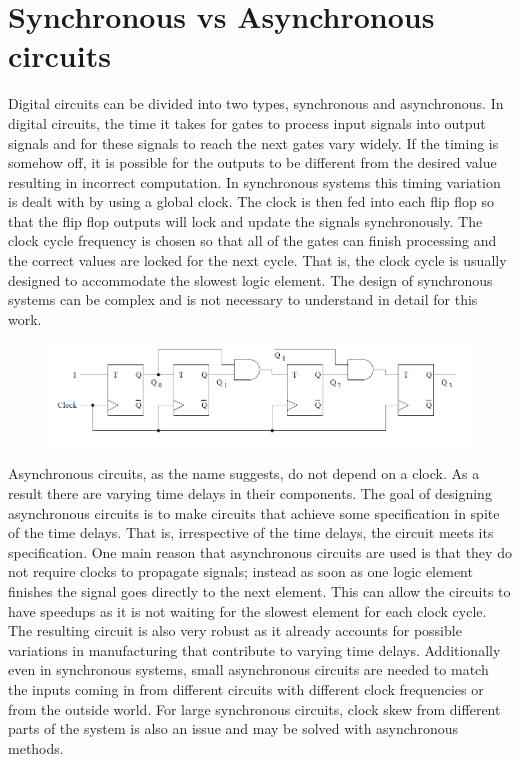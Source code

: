 \documentclass[12pt]{report}
\begin{document}
\section{Synchronous vs Asynchronous circuits}
Digital circuits can be divided into two types, synchronous and asynchronous.  In digital circuits, the time it takes for gates to process input signals into output signals and for these signals to reach the next gates vary widely.  If the timing is somehow off, it is possible for the outputs to be different from the desired value resulting in incorrect computation. In synchronous systems this timing variation is dealt with by using a global clock.  The clock is then fed into each flip flop so that the flip flop outputs will lock and update the signals synchronously. The clock cycle frequency is chosen so that all of the gates can finish processing and the correct values are locked for the next cycle. That is, the clock cycle is usually designed to accommodate the slowest logic element. The design of synchronous systems can be complex and is not necessary to understand in detail for this work. \\
\begin{figure}
\includegraphics[width=\textwidth]{syncex}
\end{figure}

Asynchronous circuits, as the name suggests, do not depend on a clock. As a result there are varying time delays in their components. The goal of designing asynchronous circuits is to make circuits that achieve some specification in spite of the time delays. That is, irrespective of the time delays, the circuit meets its specification. One main reason that asynchronous circuits are used is that they do not require clocks to propagate signals; instead as soon as one logic element finishes the signal goes directly to the next element.  This can allow the circuits to have speedups as it is not waiting for the slowest element for each clock cycle.  The resulting circuit is also very robust as it already accounts for possible variations in manufacturing that contribute to varying time delays.  Additionally even in synchronous systems, small asynchronous circuits are needed to match the inputs coming in from different circuits with different clock frequencies or from the outside world.  For large synchronous circuits, clock skew from different parts of the system is also an issue and may be solved with asynchronous methods. \\ %
\end{document}
